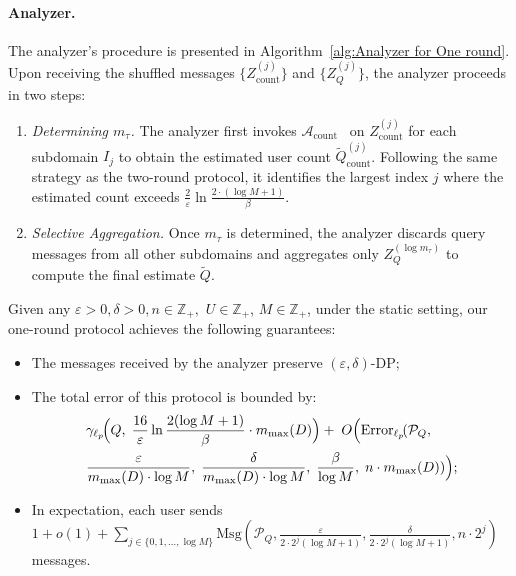 \paragraph{Analyzer.}
The analyzer's procedure is presented in Algorithm~\ref{alg:Analyzer for One round}.
Upon receiving the shuffled messages $\{Z^{(j)}_\text{count}\}$ and $\{Z^{(j)}_Q\}$, the analyzer proceeds in two steps:
\begin{enumerate}
\item \textit{Determining $m_\tau$.} 
The analyzer first invokes $\mathcal{A}_\text{count}$~\cite{ghazi2021differentially} on $Z^{(j)}_\text{count}$ for each subdomain $I_j$ to obtain the estimated user count $\tilde{Q}^{(j)}_\text{count}$. 
Following the same strategy as the two-round protocol, it identifies the largest index $j$ where the estimated count exceeds $\frac{2}{\varepsilon}\ln\frac{2 \cdot (\log M+1)}{\beta}$. 
\item \textit{Selective Aggregation.} Once $m_\tau$ is determined, the analyzer discards query messages from all other subdomains and aggregates only $Z_Q^{(\log m_\tau)}$ to compute the final estimate $\tilde{Q}$.
\end{enumerate}


\begin{theorem}
\label{the: static one-round}   
    Given any $\varepsilon > 0, \delta >0, n \in \mathbb{Z}_+, $ $U \in \mathbb{Z}_{+}$, $M \in \mathbb{Z}_{+}$, under the static setting, our one-round protocol achieves the following guarantees:

    \begin{itemize}
    \item The messages received by the analyzer preserve $(\varepsilon,\delta)$-DP;
    \item The total error of this protocol is bounded by:
    \[
    \begin{aligned}
    &\mathrm{\gamma}_{\ell_p}\!\Big(
        Q,\;
        \frac{16}{\varepsilon}\ln\frac{2(\log M+1)}{\beta} \cdot m_{\max}(D)
    \Big)
    +\;
    O\Big(\mathrm{Error}_{\ell_p}\!(
        \mathcal{P}_Q,\;    \\
    &
        \frac{\varepsilon}{m_{\max}(D)\cdot \log M},\;
        \frac{\delta}{m_{\max}(D)\cdot \log M},\;
        \frac{\beta}{\log M},\;
        n\cdot m_{\max}(D)
    )\Big);
    \end{aligned}
    \]



    \item In expectation, each user sends $1+o(1)+\sum_{j \in \{0,1,\dots, \log M\}} \allowbreak \mathrm{Msg}(\mathcal{P}_Q, \frac{\varepsilon}{2\cdot 2^j(\log M+1)}, \frac{\delta}{2\cdot 2^j(\log M+1)},n \cdot 2^j)$ messages.

\end{itemize}

\end{theorem}


